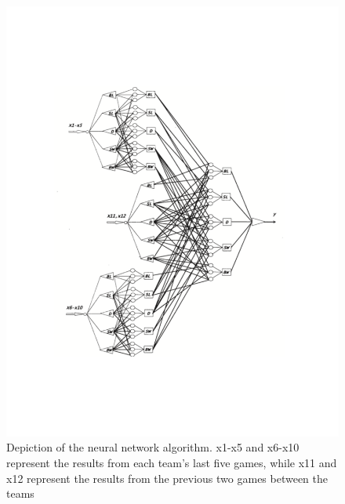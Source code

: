 \documentclass[sigconf]{acmart}
\begin{document}
\begin{figure}
\centering
\includegraphics[scale=.5]{images/neuralnetworkdiagram.pdf}
\caption{Depiction of the neural network algorithm. x1-x5 and x6-x10 represent the results from each team's last five games, while x11 and x12 represent the results from the previous two games between the teams}
\label{fig:Nerual network depiction}
\end{figure}
\end{document}
